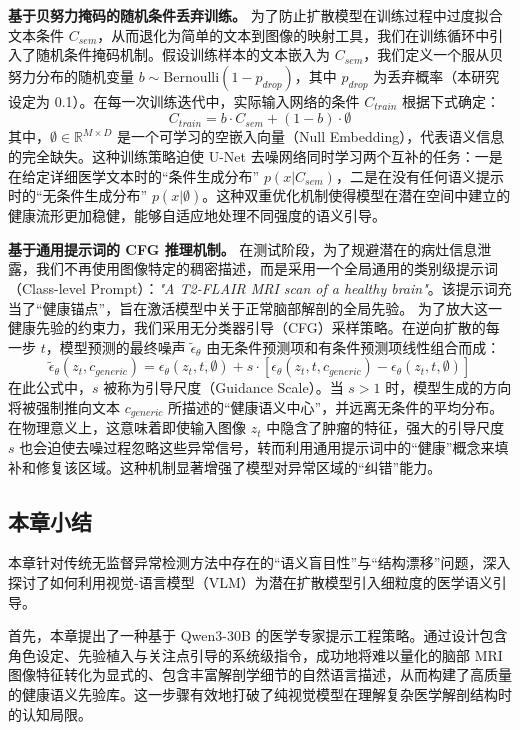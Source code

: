 \documentclass[Win]{xjtuBSThesis}  %
\begin{document}
\textbf{基于贝努力掩码的随机条件丢弃训练。} 
为了防止扩散模型在训练过程中过度拟合文本条件 $C_{sem}$，从而退化为简单的文本到图像的映射工具，我们在训练循环中引入了随机条件掩码机制。假设训练样本的文本嵌入为 $C_{sem}$，我们定义一个服从贝努力分布的随机变量 $b \sim \text{Bernoulli}(1 - p_{drop})$，其中 $p_{drop}$ 为丢弃概率（本研究设定为 0.1）。在每一次训练迭代中，实际输入网络的条件 $C_{train}$ 根据下式确定：
\begin{equation}
    C_{train} = b \cdot C_{sem} + (1 - b) \cdot \emptyset
\end{equation}
其中，$\emptyset \in \mathbb{R}^{M \times D}$ 是一个可学习的空嵌入向量（Null Embedding），代表语义信息的完全缺失。这种训练策略迫使 U-Net 去噪网络同时学习两个互补的任务：一是在给定详细医学文本时的“条件生成分布” $p(x|C_{sem})$，二是在没有任何语义提示时的“无条件生成分布” $p(x|\emptyset)$。这种双重优化机制使得模型在潜在空间中建立的健康流形更加稳健，能够自适应地处理不同强度的语义引导。

\textbf{基于通用提示词的 CFG 推理机制。} 
在测试阶段，为了规避潜在的病灶信息泄露，我们不再使用图像特定的稠密描述，而是采用一个全局通用的类别级提示词（Class-level Prompt）：\textit{"A T2-FLAIR MRI scan of a healthy brain"}。该提示词充当了“健康锚点”，旨在激活模型中关于正常脑部解剖的全局先验。
为了放大这一健康先验的约束力，我们采用无分类器引导（CFG）采样策略。在逆向扩散的每一步 $t$，模型预测的最终噪声 $\tilde{\epsilon}_\theta$ 由无条件预测项和有条件预测项线性组合而成：
\begin{equation}
    \tilde{\epsilon}_\theta(z_t, c_{generic}) = \epsilon_\theta(z_t, t, \emptyset) + s \cdot \left[ \epsilon_\theta(z_t, t, c_{generic}) - \epsilon_\theta(z_t, t, \emptyset) \right]
\end{equation}
在此公式中，$s$ 被称为引导尺度（Guidance Scale）。当 $s > 1$ 时，模型生成的方向将被强制推向文本 $c_{generic}$ 所描述的“健康语义中心”，并远离无条件的平均分布。在物理意义上，这意味着即使输入图像 $z_t$ 中隐含了肿瘤的特征，强大的引导尺度 $s$ 也会迫使去噪过程忽略这些异常信号，转而利用通用提示词中的“健康”概念来填补和修复该区域。这种机制显著增强了模型对异常区域的“纠错”能力。

\subsection{本章小结}

本章针对传统无监督异常检测方法中存在的“语义盲目性”与“结构漂移”问题，深入探讨了如何利用视觉-语言模型（VLM）为潜在扩散模型引入细粒度的医学语义引导。

首先，本章提出了一种基于 Qwen3-30B 的医学专家提示工程策略。通过设计包含角色设定、先验植入与关注点引导的系统级指令，成功地将难以量化的脑部 MRI 图像特征转化为显式的、包含丰富解剖学细节的自然语言描述，从而构建了高质量的健康语义先验库。这一步骤有效地打破了纯视觉模型在理解复杂医学解剖结构时的认知局限。
\end{document}
